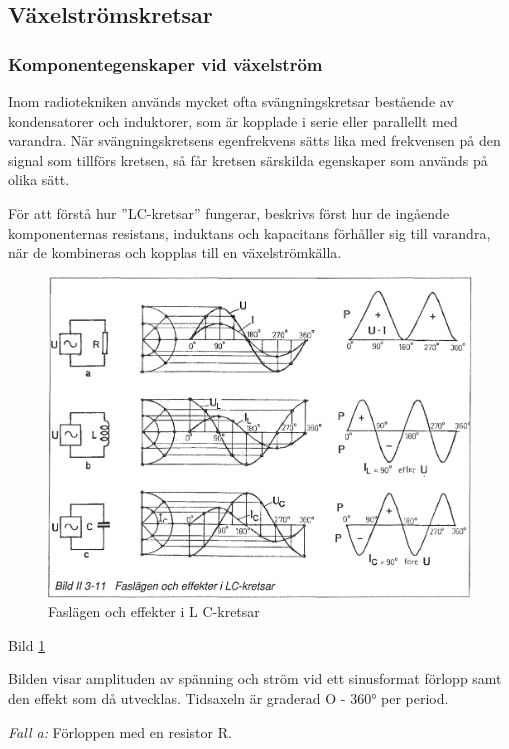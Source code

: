 \subsection{Växelströmskretsar}

\subsubsection{Komponentegenskaper vid växelström}

Inom radiotekniken används mycket ofta svängningskretsar bestående av
kondensatorer och induktorer, som är kopplade i serie eller parallellt med
varandra. När svängningskretsens egenfrekvens sätts lika med frekvensen på den
signal som tillförs kretsen, så får kretsen särskilda egenskaper som används på
olika sätt.

För att förstå hur ''LC-kretsar'' fungerar, beskrivs först hur de ingående
komponenternas resistans, induktans och kapacitans förhåller sig till varandra,
när de kombineras och kopplas till en växelströmkälla.

\begin{figure}
\includegraphics[width=\textwidth]{images/bild_2_3-11}
\caption{Faslägen och effekter i L C-kretsar}
\label{fig:BildII3-11}
\end{figure}

Bild \ref{fig:BildII3-11}

Bilden visar amplituden av spänning och ström vid ett sinusformat förlopp samt
den effekt som då utvecklas. Tidsaxeln är graderad O - 360° per period.

\emph{Fall a:} Förloppen med en resistor R.

